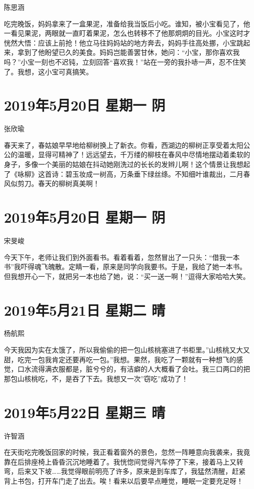 陈思涵

吃完晚饭，妈妈拿来了一盒果泥，准备给我当饭后小吃。谁知，被小宝看见了，他一看见果泥，两眼就一直盯着果泥，怎么也转移不了他那炯炯的目光。小宝这时才恍然大悟：应该上前抢！他立马往妈妈站的地方奔去，妈妈手往高处挪，小宝跳起来，拿到了他盼望已久的美食。妈妈岂能善罢甘休，她问：``小宝，那你喜欢我吗？''小宝一刻也不迟钝，立刻回答``喜欢我！''站在一旁的我扑哧一声，忍不住笑了。我想，这小宝可真搞笑。

\section{2019年5月20日 星期一 阴}

张欣瑜

春天来了，春姑娘早早地给柳树换上了新衣。你看，西湖边的柳树正享受着太阳公公的温暖，显得可精神了！远远望去，千万缕的柳枝在春风中尽情地摆动着柔软的身子，多像一个美丽的姑娘在抖动她刚洗过的长长的发辫儿啊！这个情景让我想起了《咏柳》这首诗：碧玉妆成一树高，万条垂下绿丝绦。不知细叶谁裁出，二月春风似剪刀。春天的柳树真美啊！

\section{2019年5月20日 星期一 阴}

宋旻峻

今天下午，老师让我们到外面看书。看着看着，忽然冒出了一只头：``借我一本书''我吓得魂飞魄散。定睛一看，原来是同学向我要书。于是，我给了她一本书。但我想开心一下，就把另一本也给了她，说：``买一送一啊！''逗得大家哈哈大笑。

\section{2019年5月21日 星期二 晴}

杨航熙

今天我因为实在太饿了，所以我偷偷的把一包山核桃塞进了书柜里。''山核桃又大又甜，吃完一包我肯定还要再吃一包。''我想。果然，我吃了一颗就有一种想飞的感觉，口水流得满衣服都是，脏兮兮的，有洁癖的人大概看了会吐。我三口两口的把那包山核桃吃，不，是吞了下去。我想又一次''窃吃''成功了！

\section{2019年5月22日 星期三 晴}

许智涵

在天街吃完晚饭回家的时候，我正看着窗外的景色，忽然一阵睡意向我袭来，我竟靠在后排座椅上昏昏沉沉地睡着了。我恍惚间觉得汽车停了下来，接着马上又转弯，后来又下坡\ldots\ldots 我觉得眼前明亮了许多，原来是到车库了，我猛然清醒，赶紧背上书包，打开车门走了出去。唉！看来以后要早点睡觉，睡眠一定要充足呀！

